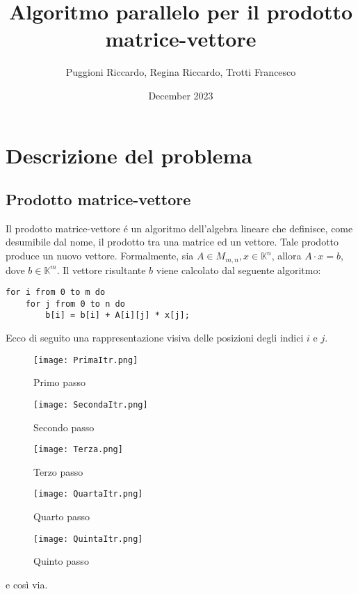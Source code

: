 \documentclass{article}
\title{Algoritmo parallelo per il prodotto matrice-vettore}
\author{Puggioni Riccardo, Regina Riccardo, Trotti Francesco }
\date{December 2023}
\begin{document}
\maketitle

\newpage
\tableofcontents

\newpage
\section{Descrizione del problema}

\subsection{Prodotto matrice-vettore}
Il prodotto matrice-vettore é un algoritmo dell'algebra lineare che definisce, come desumibile dal nome, il prodotto tra una matrice ed un vettore. Tale prodotto produce un nuovo vettore.
Formalmente, sia $A \in M_{m,n}, x \in \mathbb{K}^n$, allora $A\cdot x = b$, dove $b \in \mathbb{K}^m$.
Il vettore risultante $b$ viene calcolato dal seguente algoritmo:
\begin{lstlisting}
for i from 0 to m do
    for j from 0 to n do
        b[i] = b[i] + A[i][j] * x[j];
\end{lstlisting}
Ecco di seguito una rappresentazione visiva delle posizioni degli indici $i$ e $j$.
\begin{figure}[h]
    \centering
    \texttt{[image: PrimaItr.png]}
    \caption{Primo passo}
    \label{fig:enter-label}    
\end{figure}
\begin{figure}[h]
    \centering
    \texttt{[image: SecondaItr.png]}
    \caption{Secondo passo}
    \label{fig:enter-label}    
\end{figure}
\begin{figure}[h]
    \centering
    \texttt{[image: Terza.png]}
    \caption{Terzo passo}
    \label{fig:enter-label}    
\end{figure}
\begin{figure}[h]
    \centering
    \texttt{[image: QuartaItr.png]}
    \caption{Quarto passo}
    \label{fig:enter-label}    
\end{figure}
\begin{figure}[h]
    \centering
    \texttt{[image: QuintaItr.png]}
    \caption{Quinto passo}
    \label{fig:enter-label}    
\end{figure}
e così via.
\end{document}
